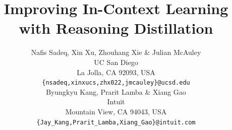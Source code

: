 \documentclass{article} %
\title{Improving In-Context Learning with Reasoning Distillation}
\author{Nafis Sadeq, Xin Xu, Zhouhang Xie \& Julian McAuley\\
UC San Diego \\
La Jolla, CA 92093, USA \\
\texttt{\{nsadeq,xinxucs,zhx022,jmcauley\}@ucsd.edu} \\
\AND
Byungkyu Kang, Prarit Lamba \& Xiang Gao \\
Intuit \\
Mountain View, CA 94043, USA\\
\texttt{\{Jay\_Kang,Prarit\_Lamba,Xiang\_Gao\}@intuit.com} \\
}
\begin{document}
\ifcolmsubmission
\linenumbers
\fi

\maketitle
















\end{document}
